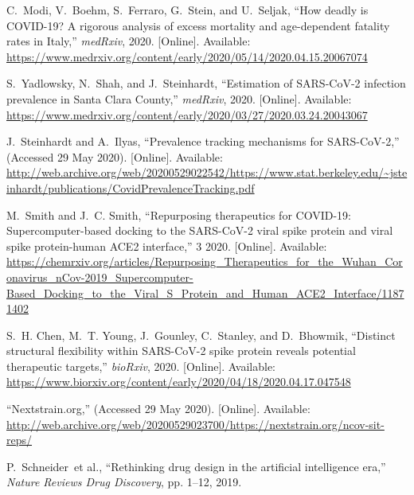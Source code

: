 \begin{thebibliography}{10}
\BIBentryALTinterwordspacing
C.~Modi, V.~Boehm, S.~Ferraro, G.~Stein, and U.~Seljak, ``{How deadly is
  COVID-19? A rigorous analysis of excess mortality and age-dependent fatality
  rates in Italy},'' \emph{medRxiv}, 2020. [Online]. Available:
  \url{https://www.medrxiv.org/content/early/2020/05/14/2020.04.15.20067074}
\BIBentrySTDinterwordspacing

\BIBentryALTinterwordspacing
S.~Yadlowsky, N.~Shah, and J.~Steinhardt, ``{Estimation of SARS-CoV-2 infection
  prevalence in Santa Clara County},'' \emph{medRxiv}, 2020. [Online].
  Available:
  \url{https://www.medrxiv.org/content/early/2020/03/27/2020.03.24.20043067}
\BIBentrySTDinterwordspacing

\BIBentryALTinterwordspacing
J.~Steinhardt and A.~Ilyas, ``{Prevalence tracking mechanisms for
  SARS-CoV-2},'' (Accessed 29 May 2020). [Online]. Available:
  \url{http://web.archive.org/web/20200529022542/https://www.stat.berkeley.edu/~jsteinhardt/publications/CovidPrevalenceTracking.pdf}
\BIBentrySTDinterwordspacing

\BIBentryALTinterwordspacing
M.~Smith and J.~C. Smith, ``{Repurposing therapeutics for COVID-19:
  Supercomputer-based docking to the SARS-CoV-2 viral spike protein and viral
  spike protein-human ACE2 interface},'' 3 2020. [Online]. Available:
  \url{https://chemrxiv.org/articles/Repurposing_Therapeutics_for_the_Wuhan_Coronavirus_nCov-2019_Supercomputer-Based_Docking_to_the_Viral_S_Protein_and_Human_ACE2_Interface/11871402}
\BIBentrySTDinterwordspacing

\BIBentryALTinterwordspacing
S.~H. Chen, M.~T. Young, J.~Gounley, C.~Stanley, and D.~Bhowmik, ``{Distinct
  structural flexibility within SARS-CoV-2 spike protein reveals potential
  therapeutic targets},'' \emph{bioRxiv}, 2020. [Online]. Available:
  \url{https://www.biorxiv.org/content/early/2020/04/18/2020.04.17.047548}
\BIBentrySTDinterwordspacing

\BIBentryALTinterwordspacing
``{Nextstrain.org},'' (Accessed 29 May 2020). [Online]. Available:
  \url{http://web.archive.org/web/20200529023700/https://nextstrain.org/ncov-sit-reps/}
\BIBentrySTDinterwordspacing

P.~Schneider~et al., ``Rethinking drug design in the artificial intelligence
  era,'' \emph{Nature Reviews Drug Discovery}, pp. 1--12, 2019.


\end{thebibliography}
